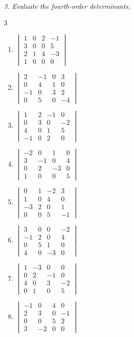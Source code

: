 \emph{3. Evaluate the fourth-order determinants.}
\bigskip
\begin{multicols}{3}\raggedright
\begin{enumerate}[label=\arabic*.,  leftmargin=*]
\item $\begin{vmatrix}1&0&2&-1\\3&0&0&5\\2&1&4&-3\\1&0&0&0\end{vmatrix}$
\item $\begin{vmatrix}2&-1&0&3\\0&4&1&0\\-1&0&3&2\\0&5&0&-4\end{vmatrix}$
\item $\begin{vmatrix}1&2&-1&0\\0&3&0&-2\\4&0&1&5\\-1&0&2&0\end{vmatrix}$
\item $\begin{vmatrix}-2&0&1&0\\3&-1&0&4\\0&2&-3&0\\1&0&0&5\end{vmatrix}$
\item $\begin{vmatrix}0&1&-2&3\\1&0&4&0\\-3&2&0&1\\0&0&5&-1\end{vmatrix}$
\item $\begin{vmatrix}3&0&0&-2\\-1&2&0&4\\0&5&1&0\\4&0&-3&0\end{vmatrix}$
\item $\begin{vmatrix}1&-3&0&0\\0&2&-1&0\\4&0&3&-2\\0&1&0&5\end{vmatrix}$
\item $\begin{vmatrix}-1&0&4&0\\2&3&0&-1\\0&0&5&2\\3&-2&0&0\end{vmatrix}$

\end{enumerate}
\end{multicols}
